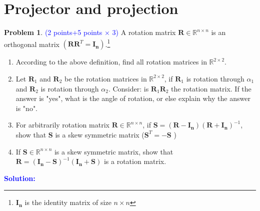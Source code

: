 \documentclass[english,onecolumn]{IEEEtran}
\begin{document}
\newpage
\section{Projector and projection}
\noindent\textbf{Problem 1}. \textcolor{blue}{(2 points+5 points $\times$ 3)}
A rotation matrix $\mathbf{R} \in \mathbb{R}^{n \times n}$ is an orthogonal matrix $(\mathbf{RR}^T = \mathbf{I_n})$.\footnote{$\mathbf{I_n}$ is the identity matrix of size $n\times n$}
\begin{enumerate}
    \item According to the above definition, find all rotation matrices in $\mathbb{R}^{2 \times 2}$.
    \item Let $\mathbf{R}_1$ and $\mathbf{R}_2$ be the rotation matrices in $\mathbb{R}^{2 \times 2}$, if $\mathbf{R}_1$ is rotation through $\alpha_1$ and $\mathbf{R}_2$ is rotation through $\alpha_2$. Consider: is  $\mathbf{R}_1 \mathbf{R}_2$ the rotation matrix. If the answer is "yes", what is the angle of rotation, or else explain why the answer is "no".
    \item For arbitrarily rotation matrix $\mathbf{R} \in \mathbb{R}^{n \times n}$, if $\mathbf{S} = (\mathbf{R}-\mathbf{I_n})(\mathbf{R}+\mathbf{I_n})^{-1}$, show that $\mathbf{S}$ is a skew symmetric matrix ($\mathbf{S}^T = -\mathbf{S}$ )
    \item If $\mathbf{S} \in \mathbb{R}^{n \times n}$ is a skew symmetric matrix, show that $\mathbf{R} = (\mathbf{I_n}-\mathbf{S})^{-1} (\mathbf{I_n} +\mathbf{S})$ is a rotation matrix.
\end{enumerate}
\noindent\textcolor{blue}{
	\textbf{Solution:}
}
\end{document}
